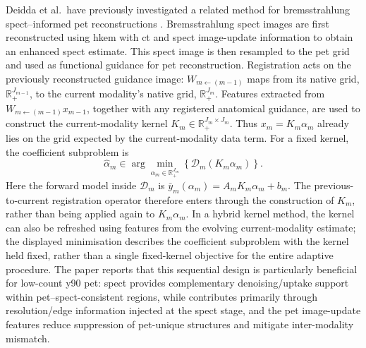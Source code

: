 Deidda et al.~have previously investigated a related method for  bremsstrahlung \gls{spect}--informed \gls{pet} reconstructions \cite{deiddaTripleModalityImage2023}. Bremsstrahlung \gls{spect} images are first reconstructed using \gls{hkem} with \gls{ct} and \gls{spect} image-update information to obtain an enhanced \gls{spect} estimate. This \gls{spect} image is then resampled to the \gls{pet} grid and used as functional guidance for \gls{pet} reconstruction.
Registration acts on the previously reconstructed guidance image: $W_{m\leftarrow(m-1)}$ maps from its native grid, $\mathbb R_+^{J_{m-1}}$, to the current modality's native grid, $\mathbb R_+^{J_m}$. Features extracted from $W_{m\leftarrow(m-1)}x_{m-1}$, together with any registered anatomical guidance, are used to construct the current-modality kernel $K_m\in\mathbb R_+^{J_m\times J_m}$. Thus $x_m=K_m\alpha_m$ already lies on the grid expected by the current-modality data term. For a fixed kernel, the coefficient subproblem is
\begin{equation}
    \hat{\alpha}_m \in \arg\min_{\alpha_m\in\mathbb R_+^{J_m}}
    \left\{
        \mathcal{D}_m\!\left(K_m\alpha_m\right)
    \right\}.
\end{equation}
Here the forward model inside $\mathcal D_m$ is $\bar y_m(\alpha_m)=A_mK_m\alpha_m+b_m$. The previous-to-current registration operator therefore enters through the construction of $K_m$, rather than being applied again to $K_m\alpha_m$. In a hybrid kernel method, the kernel can also be refreshed using features from the evolving current-modality estimate; the displayed minimisation describes the coefficient subproblem with the kernel held fixed, rather than a single fixed-kernel objective for the entire adaptive procedure.
The paper reports that this sequential design is particularly beneficial for low-count \gls{y90} \gls{pet}: \gls{spect} provides complementary denoising/uptake support within \gls{pet}--\gls{spect}-consistent regions, while  contributes primarily through resolution/edge information injected at the \gls{spect} stage, and the \gls{pet} image-update features reduce suppression of \gls{pet}-unique structures and mitigate inter-modality mismatch.

